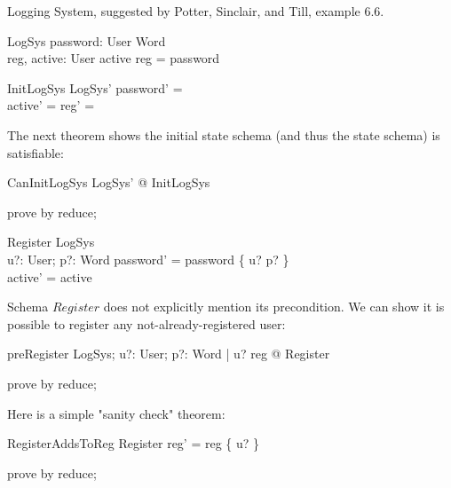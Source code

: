 \documentclass{article}
\begin{document}
Logging System, suggested by Potter, Sinclair, and Till, example 6.6.

\begin{zed}
\end{zed}

\begin{schema}{LogSys}
  password: User \pfun Word \\
  reg, active: \finset User
\where
  active \subseteq reg = \dom password
\end{schema}

\begin{schema}{InitLogSys}
  LogSys'
\where
  password' = \emptyset \\
  active' = reg' = \emptyset
\end{schema}

The next theorem shows the initial state schema (and thus the state schema) is
satisfiable:

\begin{theorem}{CanInitLogSys}
  \exists LogSys' @ InitLogSys
\end{theorem}
\begin{zproof}
prove by reduce;
\end{zproof}

\begin{schema}{Register}
  \Delta LogSys \\
  u?: User; p?: Word
\where
  password' = password \cup \{ u? \mapsto p? \} \\
  active' = active
\end{schema}

Schema $Register$ does not explicitly mention its precondition.  We can
show it is possible to register any
not-already-registered user:

\begin{theorem}{preRegister}
   \forall LogSys; u?: User; p?: Word
          | u? \notin reg
          @ \pre Register
\end{theorem}

\begin{zproof}
prove by reduce;
\end{zproof}

Here is a simple "sanity check" theorem:
\begin{theorem}{RegisterAddsToReg}
  Register \implies reg' = reg \cup \{ u? \}
\end{theorem}

\begin{zproof}
prove by reduce;
\end{zproof}
\end{document}
